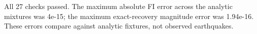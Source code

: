 All 27 checks passed. The maximum absolute FI error across the analytic mixtures was 4e-15; the maximum exact-recovery magnitude error was 1.94e-16. These errors compare against analytic fixtures, not observed earthquakes.
